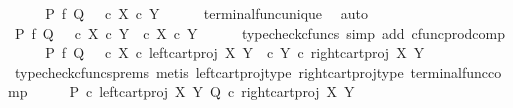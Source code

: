 \begin{isabellebody}
\ \ \isamarkupfalse%
\ \isamarkupfalse%
\ {\isachardoublequoteopen}P\ {\isasymtimes}\isactrlsub f\ Q\ {\isacharequal}{\kern0pt}\ {\isasymlangle}{\isasymf}{\isacharcomma}{\kern0pt}{\isasymf}{\isasymrangle}\ {\isasymcirc}\isactrlsub c\ {\isasymbeta}\isactrlbsub X\ {\isasymtimes}\isactrlsub c\ Y\isactrlesub {\isachardoublequoteclose}\isanewline
\ \ \ \ \isamarkupfalse%
\ terminal{\isacharunderscore}{\kern0pt}func{\isacharunderscore}{\kern0pt}unique\ \isamarkupfalse%
\ auto\isanewline
\ \ \isamarkupfalse%
\ \isamarkupfalse%
\ {\isachardoublequoteopen}P\ {\isasymtimes}\isactrlsub f\ Q\ {\isacharequal}{\kern0pt}\ {\isasymlangle}{\isasymf}\ {\isasymcirc}\isactrlsub c\ {\isasymbeta}\isactrlbsub X\ {\isasymtimes}\isactrlsub c\ Y\isactrlesub {\isacharcomma}{\kern0pt}\ {\isasymf}\ {\isasymcirc}\isactrlsub c\ {\isasymbeta}\isactrlbsub X\ {\isasymtimes}\isactrlsub c\ Y\isactrlesub {\isasymrangle}{\isachardoublequoteclose}\isanewline
\ \ \ \ \isamarkupfalse%
\ {\isacharparenleft}{\kern0pt}typecheck{\isacharunderscore}{\kern0pt}cfuncs{\isacharcomma}{\kern0pt}\ simp\ add{\isacharcolon}{\kern0pt}\ cfunc{\isacharunderscore}{\kern0pt}prod{\isacharunderscore}{\kern0pt}comp{\isacharparenright}{\kern0pt}\isanewline
\ \ \isamarkupfalse%
\ \isamarkupfalse%
\ {\isachardoublequoteopen}P\ {\isasymtimes}\isactrlsub f\ Q\ {\isacharequal}{\kern0pt}\ {\isasymlangle}{\isasymf}\ {\isasymcirc}\isactrlsub c\ {\isasymbeta}\isactrlbsub X\isactrlesub \ {\isasymcirc}\isactrlsub c\ left{\isacharunderscore}{\kern0pt}cart{\isacharunderscore}{\kern0pt}proj\ X\ Y{\isacharcomma}{\kern0pt}\ {\isasymf}\ {\isasymcirc}\isactrlsub c\ {\isasymbeta}\isactrlbsub Y\isactrlesub \ {\isasymcirc}\isactrlsub c\ right{\isacharunderscore}{\kern0pt}cart{\isacharunderscore}{\kern0pt}proj\ X\ Y{\isasymrangle}{\isachardoublequoteclose}\isanewline
\ \ \ \ \isamarkupfalse%
\ {\isacharparenleft}{\kern0pt}typecheck{\isacharunderscore}{\kern0pt}cfuncs{\isacharunderscore}{\kern0pt}prems{\isacharcomma}{\kern0pt}\ metis\ left{\isacharunderscore}{\kern0pt}cart{\isacharunderscore}{\kern0pt}proj{\isacharunderscore}{\kern0pt}type\ right{\isacharunderscore}{\kern0pt}cart{\isacharunderscore}{\kern0pt}proj{\isacharunderscore}{\kern0pt}type\ terminal{\isacharunderscore}{\kern0pt}func{\isacharunderscore}{\kern0pt}comp{\isacharparenright}{\kern0pt}\isanewline
\ \ \isamarkupfalse%
\ \isamarkupfalse%
\ {\isachardoublequoteopen}{\isasymlangle}P\ {\isasymcirc}\isactrlsub c\ left{\isacharunderscore}{\kern0pt}cart{\isacharunderscore}{\kern0pt}proj\ X\ Y{\isacharcomma}{\kern0pt}\ Q\ {\isasymcirc}\isactrlsub c\ right{\isacharunderscore}{\kern0pt}cart{\isacharunderscore}{\kern0pt}proj\ X\ Y{\isasymrangle}\isanewline

\end{isabellebody}
